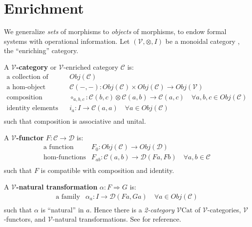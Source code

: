 \documentclass[a4paper,UKenglish]{article}
\theoremstyle{definition}
\newcommand{\Cat}{\mathrm{Cat}}
\newcommand{\V}{\mathscr{V}}
\newcommand{\D}{\mathscr{D}}
\newcommand{\C}{\mathscr{C}}
\begin{document}
\section{Enrichment}
We generalize \textit{sets} of morphisms to \textit{objects} of morphisms, to endow formal systems with operational information. Let $(\V,\otimes,I)$ be a monoidal category \cite{maclane}, the ``enriching'' category.

A \textbf{$\V$-category} or $\V$-enriched category $\C$ is:
\[\begin{array}{rl}
\text{a collection of objects} & Obj(\C)\\
\text{a hom-object function} & \C(-,-):Obj(\C) \times Obj(\C) \to Obj(\V)\\
\text{composition morphisms} & \circ_{a,b,c}:\C(b,c) \otimes \C(a,b) \to \C(a,c) \quad \forall a,b,c \in Obj(\C)\\
\text{identity elements} & i_a:I\to\C(a,a) \quad \forall a \in Obj(\C)\\
\end{array}\]
such that composition is associative and unital.

A \textbf{$\V$-functor} $F:\C \to \D$ is:
\[\begin{array}{rl}
\text{a function} & F_0: Obj(\C) \to Obj(\D)\\
\text{hom-functions} & F_{ab}: \C(a,b) \to \D(Fa,Fb) \quad \forall a,b \in \C\\
\end{array}\]
such that $F$ is compatible with composition and identity.

A \textbf{$\V$-natural transformation} $\alpha: F \Rightarrow G$ is:
\[\begin{array}{rl}
\text{a family} & \alpha_a: I \to \D(Fa,Ga) \quad \forall a \in Obj(\C)\\
\end{array}\]
such that $\alpha$ is ``natural'' in $a$. Hence there is a \textit{2-category} \textbf{$\V\Cat$} of $\V$-categories, $\V$-functors, and $\V$-natural transformations. See \cite{enrich} for reference.
\end{document}
